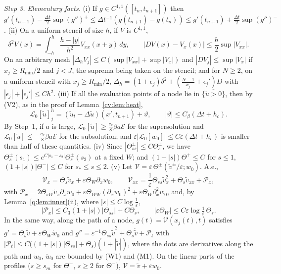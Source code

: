 \documentclass[11pt]{amsart}
\theoremstyle{definition}
\theoremstyle{remark}
\newcommand{\ve}{\varepsilon}
\newcommand{\Lop}{\mathcal{L}}
\begin{document}
\emph{Step 3. Elementary facts.} (i) If $g\in C^{1,1}([t_n,t_{n+1}])$ then
$g'(t_{n+1})-\frac{\Delta t}2\sup(g'')^+\le\Delta t^{-1}(g(t_{n+1})-g(t_n))\le
g'(t_{n+1})+\frac{\Delta t}2\sup(g'')^-$. (ii) On a uniform stencil of size $h$, if
$V$ is $C^{1,1}$,
\[
\delta^2V(x)=\int_{-h}^h\frac{h-|y|}{h^2}V_{xx}(x+y)\,dy,\qquad|DV(x)-V_x(x)|\le\frac h2\sup|V_{xx}| .
\]
On an arbitrary mesh $|\Delta_hV_j|\le C(\sup|V_{xx}|+\sup|V_x|)$ and $|DV_j|\le\sup|V_x|$ if
$x_j\ge R_{\min}/2$ and $j<J$, the suprema being taken on the stencil; and for $N\ge2$, on a uniform
stencil with $x_j\ge R_{\min}/2$,
$\Delta_h=(1+\epsilon_j)\delta^2+(\frac{N-1}{x_j}+\epsilon_j')D$ with $|\epsilon_j|+|\epsilon_j'|\le Ch^2$. (iii) If all the
evaluation points of a node lie in $\overline{\{\tilde u>0\}}$, then by (V2), as in the proof of
Lemma~\ref{cv:lem:heat},
\begin{equation}\label{cv:eq:outer}
\Lop_0[\tilde u]^n_j=(\tilde u_t-\Delta\tilde u)(x',t_{n+1})+\vartheta,\qquad|\vartheta|\le C_\beta(\Delta t+h_c).
\end{equation}
By Step~1, if $a$ is large, $\Lop_0[\tilde u]\ge\frac{c_v}8\beta a\mathcal E$ for the supersolution and
$\Lop_0[\tilde u]\le-\frac{c_v}8\beta a\mathcal E$ for the subsolution; and
$\ve|\Lop_0[w_0]|\le C\ve(\Delta t+h_c)$ is smaller than half of these quantities. (iv) Since
$|\Theta^\pm_{ss}|\le C\Theta^\pm_s$, we have
$\Theta^\pm_s(s_1)\le e^{C|s_1-s_2|}\Theta^\pm_s(s_2)$ at a fixed $W$; and $(1+|s|)\Theta^+\le C$ for $s\le1$,
$(1+|s|)|\Theta^-|\le C$ for $s_*\le s\le2$. (v) Let $\mathcal V=\ve\,\Theta^\pm(\tilde v^\pm/\ve;w_0)$. A.e.,
\begin{equation}\label{cv:eq:Vder}
\mathcal V_x=\Theta_s\tilde v_x+\ve\Theta_W\partial_xw_0,\qquad
\mathcal V_{xx}=\frac1\ve\Theta_{ss}\tilde v_x^2+\Theta_s\tilde v_{xx}+\mathcal P_x,
\end{equation}
with $\mathcal P_x=2\Theta_{sW}\tilde v_x\partial_xw_0+\ve\Theta_{WW}(\partial_xw_0)^2+\ve\Theta_W\partial_x^2w_0$, and, by
Lemma~\ref{q:lem:inner}(ii), where $|s|\le C\log\frac1\ve$,
\begin{equation}\label{cv:eq:Px}
|\mathcal P_x|\le C_3(1+|s|)|\Theta_{ss}|+C\Theta_s,\qquad|\ve\Theta_W|\le C\ve\log\tfrac1\ve\,\Theta_s .
\end{equation}
In the same way, along the path of a node, $g(t)=\mathcal V(x_j(t),t)$ satisfies
$g'=\Theta_s\dot{\tilde v}+\ve\Theta_W\dot w_0$ and
$g''=\ve^{-1}\Theta_{ss}\dot{\tilde v}^2+\Theta_s\ddot{\tilde v}+\mathcal P_t$ with
$|\mathcal P_t|\le C\big((1+|s|)|\Theta_{ss}|+\Theta_s\big)(1+|\dot{\tilde v}|)$, where the dots are derivatives along
the path and $\dot w_0$, $\ddot w_0$ are bounded by (W1) and (M1). On the linear parts of the
profiles ($s\ge s_m$ for $\Theta^+$, $s\ge2$ for $\Theta^-$), $\mathcal V=\tilde v+\ve w_0$.
\end{document}
